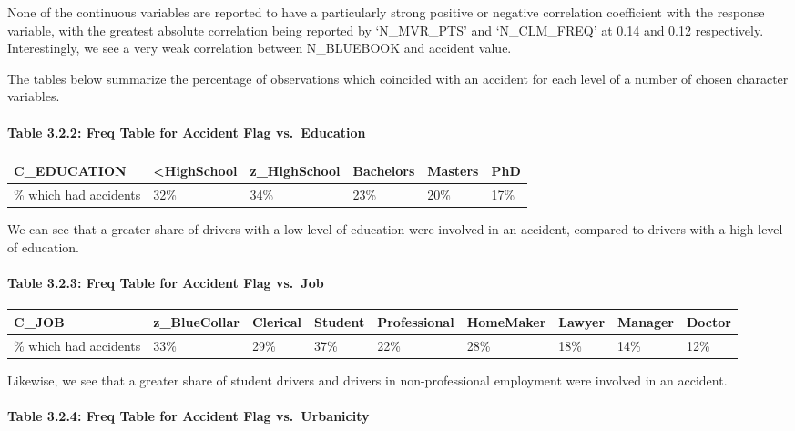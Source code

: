 \documentclass[]{article}
\let\oldparagraph\paragraph
\renewcommand{\paragraph}[1]{\oldparagraph{#1}\mbox{}}
\begin{document}
None of the continuous variables are reported to have a particularly
strong positive or negative correlation coefficient with the response
variable, with the greatest absolute correlation being reported by
`N\_MVR\_PTS' and `N\_CLM\_FREQ' at 0.14 and 0.12 respectively.
Interestingly, we see a very weak correlation between N\_BLUEBOOK and
accident value.

The tables below summarize the percentage of observations which
coincided with an accident for each level of a number of chosen
character variables.

\paragraph{Table 3.2.2: Freq Table for Accident Flag
vs.~Education}\label{table-3.2.2-freq-table-for-accident-flag-vs.education}

\begin{longtable}[]{@{}llllll@{}}
\toprule
C\_EDUCATION & \textless{}HighSchool & z\_HighSchool & Bachelors &
Masters & PhD\tabularnewline
\midrule
\endhead
\% which had accidents & 32\% & 34\% & 23\% & 20\% & 17\%\tabularnewline
\bottomrule
\end{longtable}

We can see that a greater share of drivers with a low level of education
were involved in an accident, compared to drivers with a high level of
education.

\paragraph{Table 3.2.3: Freq Table for Accident Flag
vs.~Job}\label{table-3.2.3-freq-table-for-accident-flag-vs.job}

\begin{longtable}[]{@{}lllllllll@{}}
\toprule
C\_JOB & z\_BlueCollar & Clerical & Student & Professional & HomeMaker &
Lawyer & Manager & Doctor\tabularnewline
\midrule
\endhead
\% which had accidents & 33\% & 29\% & 37\% & 22\% & 28\% & 18\% & 14\%
& 12\%\tabularnewline
\bottomrule
\end{longtable}

Likewise, we see that a greater share of student drivers and drivers in
non-professional employment were involved in an accident.

\paragraph{Table 3.2.4: Freq Table for Accident Flag
vs.~Urbanicity}\label{table-3.2.4-freq-table-for-accident-flag-vs.urbanicity}
\end{document}
